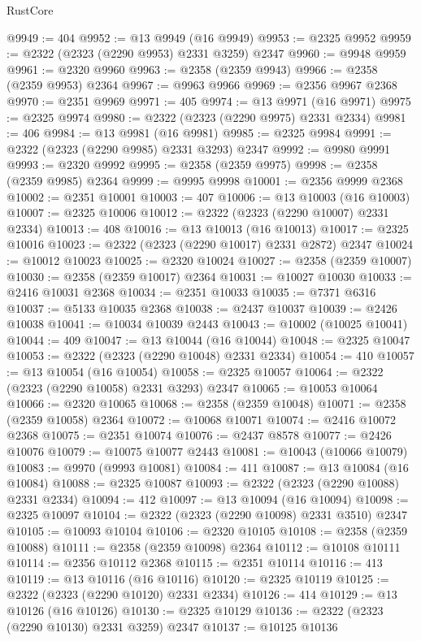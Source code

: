 \begin{lexlean}{RustCore}
\begin{coremodule}
@9949 := 404
@9952 := @13 @9949 (@16 @9949)
@9953 := @2325 @9952
@9959 := @2322 (@2323 (@2290 @9953) @2331 @3259) @2347
@9960 := @9948 @9959
@9961 := @2320 @9960
@9963 := @2358 (@2359 @9943)
@9966 := @2358 (@2359 @9953) @2364
@9967 := @9963 @9966
@9969 := @2356 @9967 @2368
@9970 := @2351 @9969
@9971 := 405
@9974 := @13 @9971 (@16 @9971)
@9975 := @2325 @9974
@9980 := @2322 (@2323 (@2290 @9975) @2331 @2334)
@9981 := 406
@9984 := @13 @9981 (@16 @9981)
@9985 := @2325 @9984
@9991 := @2322 (@2323 (@2290 @9985) @2331 @3293) @2347
@9992 := @9980 @9991
@9993 := @2320 @9992
@9995 := @2358 (@2359 @9975)
@9998 := @2358 (@2359 @9985) @2364
@9999 := @9995 @9998
@10001 := @2356 @9999 @2368
@10002 := @2351 @10001
@10003 := 407
@10006 := @13 @10003 (@16 @10003)
@10007 := @2325 @10006
@10012 := @2322 (@2323 (@2290 @10007) @2331 @2334)
@10013 := 408
@10016 := @13 @10013 (@16 @10013)
@10017 := @2325 @10016
@10023 := @2322 (@2323 (@2290 @10017) @2331 @2872) @2347
@10024 := @10012 @10023
@10025 := @2320 @10024
@10027 := @2358 (@2359 @10007)
@10030 := @2358 (@2359 @10017) @2364
@10031 := @10027 @10030
@10033 := @2416 @10031 @2368
@10034 := @2351 @10033
@10035 := @7371 @6316
@10037 := @5133 @10035 @2368
@10038 := @2437 @10037
@10039 := @2426 @10038
@10041 := @10034 @10039 @2443
@10043 := @10002 (@10025 @10041)
@10044 := 409
@10047 := @13 @10044 (@16 @10044)
@10048 := @2325 @10047
@10053 := @2322 (@2323 (@2290 @10048) @2331 @2334)
@10054 := 410
@10057 := @13 @10054 (@16 @10054)
@10058 := @2325 @10057
@10064 := @2322 (@2323 (@2290 @10058) @2331 @3293) @2347
@10065 := @10053 @10064
@10066 := @2320 @10065
@10068 := @2358 (@2359 @10048)
@10071 := @2358 (@2359 @10058) @2364
@10072 := @10068 @10071
@10074 := @2416 @10072 @2368
@10075 := @2351 @10074
@10076 := @2437 @8578
@10077 := @2426 @10076
@10079 := @10075 @10077 @2443
@10081 := @10043 (@10066 @10079)
@10083 := @9970 (@9993 @10081)
@10084 := 411
@10087 := @13 @10084 (@16 @10084)
@10088 := @2325 @10087
@10093 := @2322 (@2323 (@2290 @10088) @2331 @2334)
@10094 := 412
@10097 := @13 @10094 (@16 @10094)
@10098 := @2325 @10097
@10104 := @2322 (@2323 (@2290 @10098) @2331 @3510) @2347
@10105 := @10093 @10104
@10106 := @2320 @10105
@10108 := @2358 (@2359 @10088)
@10111 := @2358 (@2359 @10098) @2364
@10112 := @10108 @10111
@10114 := @2356 @10112 @2368
@10115 := @2351 @10114
@10116 := 413
@10119 := @13 @10116 (@16 @10116)
@10120 := @2325 @10119
@10125 := @2322 (@2323 (@2290 @10120) @2331 @2334)
@10126 := 414
@10129 := @13 @10126 (@16 @10126)
@10130 := @2325 @10129
@10136 := @2322 (@2323 (@2290 @10130) @2331 @3259) @2347
@10137 := @10125 @10136

\end{coremodule}
\end{lexlean}
